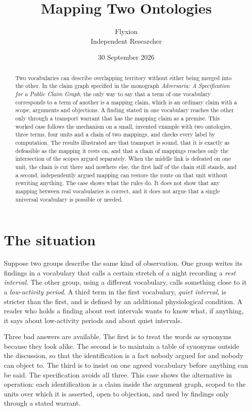 \documentclass[11pt]{article}
\title{Mapping Two Ontologies}
\author{Flyxion\\\small Independent Researcher}
\date{30 September 2026}
\begin{document}
\maketitle

\begin{abstract}
\noindent
Two vocabularies can describe overlapping territory without either being merged into the other. In the claim graph specified in the monograph \emph{Adversaria: A Specification for a Public Claim Graph}, the only way to say that a term of one vocabulary corresponds to a term of another is a mapping claim, which is an ordinary claim with a scope, arguments and objections. A finding stated in one vocabulary reaches the other only through a transport warrant that has the mapping claim as a premise. This worked case follows the mechanism on a small, invented example with two ontologies, three terms, four units and a chain of two mappings, and checks every label by computation. The results illustrated are that transport is sound, that it is exactly as defeasible as the mapping it rests on, and that a chain of mappings reaches only the intersection of the scopes argued separately. When the middle link is defeated on one unit, the chain is cut there and nowhere else, the first half of the chain still stands, and a second, independently argued mapping can restore the route on that unit without rewriting anything. The case shows what the rules do. It does not show that any mapping between real vocabularies is correct, and it does not argue that a single universal vocabulary is possible or needed.
\end{abstract}

\section{The situation}\label{sec:situation}

Suppose two groups describe the same kind of observation. One group writes its findings in a vocabulary that calls a certain stretch of a night recording a \emph{rest interval}. The other group, using a different vocabulary, calls something close to it a \emph{low-activity period}. A third term in the first vocabulary, \emph{quiet interval}, is stricter than the first, and is defined by an additional physiological condition. A reader who holds a finding about rest intervals wants to know what, if anything, it says about low-activity periods and about quiet intervals.

Three bad answers are available. The first is to treat the words as synonyms because they look alike. The second is to maintain a table of synonyms outside the discussion, so that the identification is a fact nobody argued for and nobody can object to. The third is to insist on one agreed vocabulary before anything can be said. The specification avoids all three. This case shows the alternative in operation: each identification is a claim inside the argument graph, scoped to the units over which it is asserted, open to objection, and used by findings only through a stated warrant.
\end{document}
